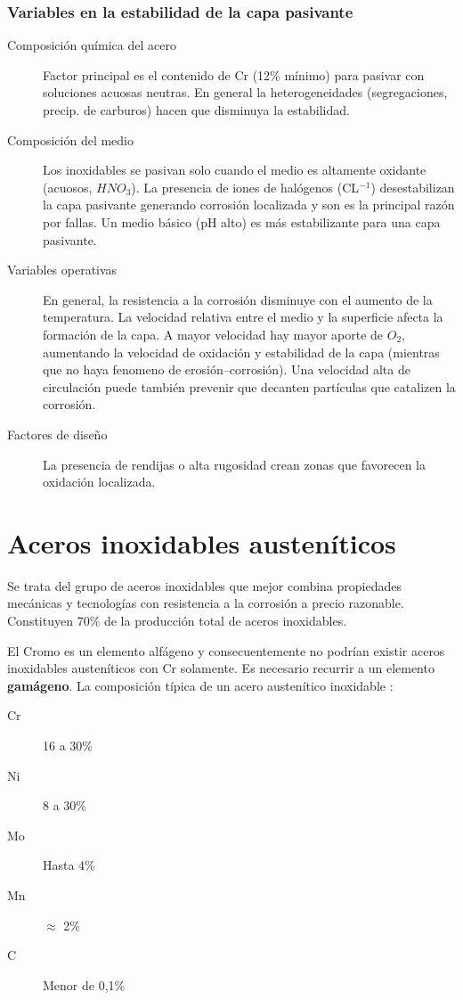\subsubsection*{Variables en la estabilidad de la capa pasivante}
\begin{description}
	\item[Composición química del acero] Factor principal es el contenido de Cr (12\% mínimo) para pasivar con soluciones acuosas neutras. En general la heterogeneidades (segregaciones, precip. de carburos) hacen que disminuya la estabilidad.
	\item[Composición del medio] Los inoxidables se pasivan solo cuando el medio es altamente oxidante (acuosos, $HNO_3$). La presencia de iones de halógenos (CL$^{-1}$) desestabilizan la capa pasivante generando corrosión localizada y son es la principal razón por fallas. Un medio básico (pH alto) es más estabilizante para una capa pasivante.
	\item[Variables operativas] En general, la resistencia a la corrosión disminuye con el aumento de la temperatura. La velocidad relativa entre el medio y la superficie afecta la formación de la capa. A mayor velocidad hay mayor aporte de $O_2$, aumentando la velocidad de oxidación y estabilidad de la capa (mientras que no haya fenomeno de erosión--corrosión). Una velocidad alta de circulación puede también prevenir que decanten partículas que catalizen la corrosión.
	\item[Factores de diseño] La presencia de rendijas o alta rugosidad crean zonas que favorecen la oxidación localizada.
\end{description}

\section{Aceros inoxidables austeníticos}
Se trata del grupo de aceros inoxidables que mejor combina propiedades mecánicas y tecnologías con resistencia a la corrosión a precio razonable. Constituyen 70\% de la producción total de aceros inoxidables. 



El Cromo es un elemento alfágeno y consecuentemente no podrían existir aceros inoxidables austeníticos con Cr solamente. Es necesario recurrir a un elemento \textbf{gamágeno}. La composición típica de un acero austenítico inoxidable :
\begin{description}
	\item[Cr] 16 a 30\%
	\item[Ni] 8 a 30\%
	\item[Mo] Hasta 4\%
	\item[Mn] $\approx$ 2\%
	\item[C] Menor de 0,1\%
\end{description}

